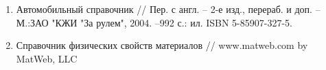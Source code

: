 \begin{enumerate}
%
%
%
\item
Автомобильный справочник //  Пер. с англ.  -- 2-е изд., перераб. и доп. --М.:ЗАО "КЖИ "За рулем", 2004. --992 с.: ил.  ISBN 5-85907-327-5.
%
%
\item 
Справочник физических свойств материалов //  www.matweb.com   by MatWeb, LLC
%
%
%

%


\end{enumerate}
